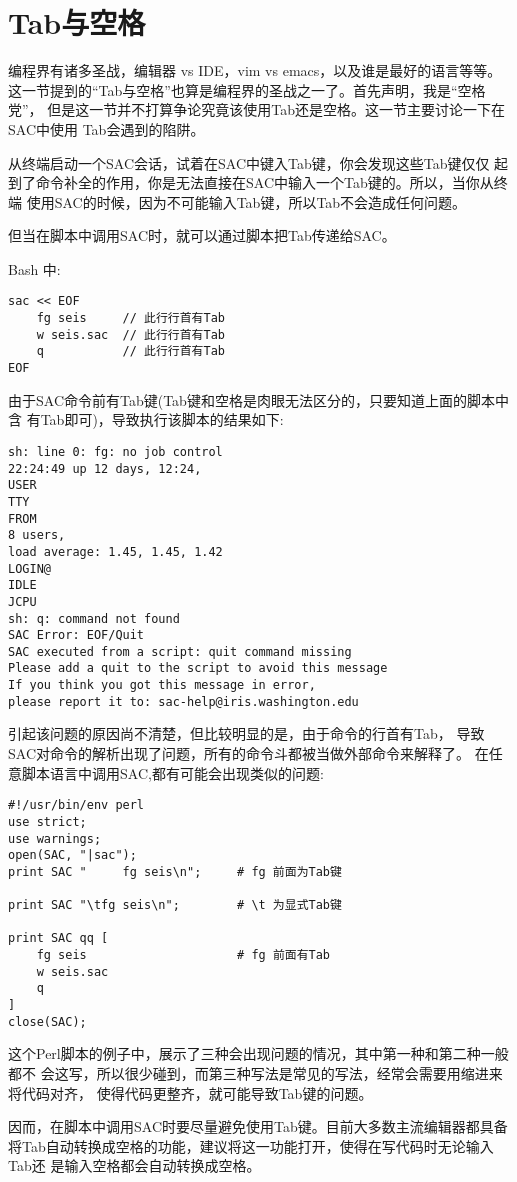 \section{Tab与空格}
编程界有诸多圣战，编辑器 vs IDE，vim vs emacs，以及谁是最好的语言等等。
这一节提到的``Tab与空格''也算是编程界的圣战之一了。首先声明，我是``空格党''，
但是这一节并不打算争论究竟该使用Tab还是空格。这一节主要讨论一下在SAC中使用
Tab会遇到的陷阱。

从终端启动一个SAC会话，试着在SAC中键入Tab键，你会发现这些Tab键仅仅
起到了命令补全的作用，你是无法直接在SAC中输入一个Tab键的。所以，当你从终端
使用SAC的时候，因为不可能输入Tab键，所以Tab不会造成任何问题。

但当在脚本中调用SAC时，就可以通过脚本把Tab传递给SAC。

Bash 中:
\begin{verbatim}
sac << EOF
    fg seis     // 此行行首有Tab
    w seis.sac  // 此行行首有Tab
    q           // 此行行首有Tab
EOF
\end{verbatim}
由于SAC命令前有Tab键(Tab键和空格是肉眼无法区分的，只要知道上面的脚本中含
有Tab即可)，导致执行该脚本的结果如下:
\begin{verbatim}
sh: line 0: fg: no job control
22:24:49 up 12 days, 12:24,
USER
TTY
FROM
8 users,
load average: 1.45, 1.45, 1.42
LOGIN@
IDLE
JCPU
sh: q: command not found
SAC Error: EOF/Quit
SAC executed from a script: quit command missing
Please add a quit to the script to avoid this message
If you think you got this message in error,
please report it to: sac-help@iris.washington.edu
\end{verbatim}

引起该问题的原因尚不清楚，但比较明显的是，由于命令的行首有Tab，
导致SAC对命令的解析出现了问题，所有的命令斗都被当做外部命令来解释了。
在任意脚本语言中调用SAC,都有可能会出现类似的问题:
\begin{verbatim}
#!/usr/bin/env perl
use strict;
use warnings;
open(SAC, "|sac");
print SAC "     fg seis\n";     # fg 前面为Tab键

print SAC "\tfg seis\n";        # \t 为显式Tab键

print SAC qq [
    fg seis                     # fg 前面有Tab
    w seis.sac
    q
]
close(SAC);
\end{verbatim}
这个Perl脚本的例子中，展示了三种会出现问题的情况，其中第一种和第二种一般都不
会这写，所以很少碰到，而第三种写法是常见的写法，经常会需要用缩进来将代码对齐，
使得代码更整齐，就可能导致Tab键的问题。

因而，在脚本中调用SAC时要尽量避免使用Tab键。目前大多数主流编辑器都具备
将Tab自动转换成空格的功能，建议将这一功能打开，使得在写代码时无论输入Tab还
是输入空格都会自动转换成空格。
